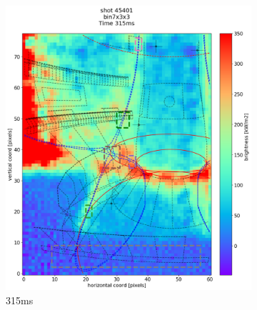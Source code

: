 \begin{figure}
     \centering
     \begin{subfigure}{0.355\linewidth}
         \centering
         \includegraphics[trim={50 0 25 80},clip,width=\textwidth]{Chapters/chapter2/figs/IRVB-MASTU_shot-45401_export_63.png}
         \caption{315ms}
         \label{fig:45401_export_1}
     \end{subfigure}
     \begin{subfigure}{0.355\linewidth}
         \centering

\end{subfigure}
\end{figure}
